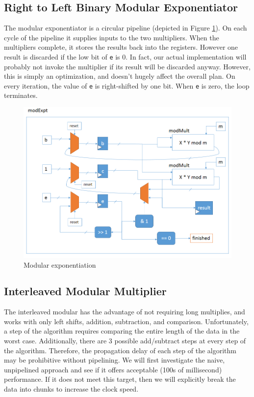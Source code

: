 \documentclass[12pt]{article}
\begin{document}
\subsection{Right to Left Binary Modular Exponentiator}
The modular exponentiator is a circular pipeline (depicted in Figure \ref{fig-expt}).
On each cycle of the pipeline it supplies inputs to the two multipliers.
When the multipliers complete, it stores the results back into the registers.
However one result is discarded if the low bit of {\tt e} is 0.
In fact, our actual implementation will probably not invoke the multiplier
if its result will be discarded anyway.
However, this is simply an optimization, and doesn't hugely affect the overall plan.
On every iteration, the value of {\tt e} is right-shifted by one bit.
When {\tt e} is zero, the loop terminates.

\begin{figure}
  \begin{centering}
    \includegraphics[width=\textwidth]{modexpt.png}
    \caption{Modular exponentiation}
    \label{fig-expt}
  \end{centering}
\end{figure}

\subsection{Interleaved Modular Multiplier}
The interleaved modular has the advantage of not requiring long multiplies, and works with
only left shifts, addition, subtraction, and comparison. Unfortunately, a step of the 
algorithm requires comparing the entire length of the data in the worst case. Additionally,
there are 3 possible add/subtract steps at every step of the algorithm. Therefore, the propagation delay
of each step of the algorithm may be prohibitive without pipelining. We will first investigate the
naive, unpipelined approach and see if it offers acceptable (100s of millisecond) performance. If it 
does not meet this target, then we will explicitly break the data into chunks to increase
the clock speed. 
\end{document}
